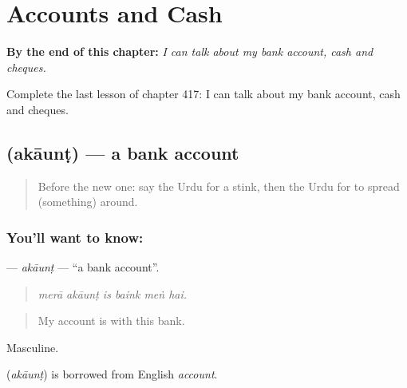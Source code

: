 
\chapter{Accounts and Cash}
\label{ch:ur-accounts-and-cash}

\begin{chapteropening}
\textbf{By the end of this chapter:} \emph{I can talk about my bank account, cash and cheques.}

Complete the last lesson of chapter 417: I can talk about my bank account, cash and cheques.
\end{chapteropening}

\section[\texorpdfstring{\ur{اکاؤنٹ} (akāunṭ)}{اکاؤنٹ (akāunṭ)}]{ (akāunṭ) — a bank account}

\label{lesson:UR-C417-akaunt}



\begin{quote}
Before the new one: say the Urdu for a stink, then the Urdu for to spread (something) around.
\end{quote}

\subsection*{You'll want to know: }
\textbf{} — \emph{akāunṭ} — \textquotedblleft{}a bank account\textquotedblright{}.

\begin{quote}
     
\end{quote}

\begin{quote}
\emph{merā akāunṭ is baink meṅ hai.}
\end{quote}

\begin{quote}
My account is with this bank.
\end{quote}

Masculine.

\begin{cousinweb}
\textbf{} (\emph{akāunṭ}) is borrowed from English \emph{account}.
\end{cousinweb}

